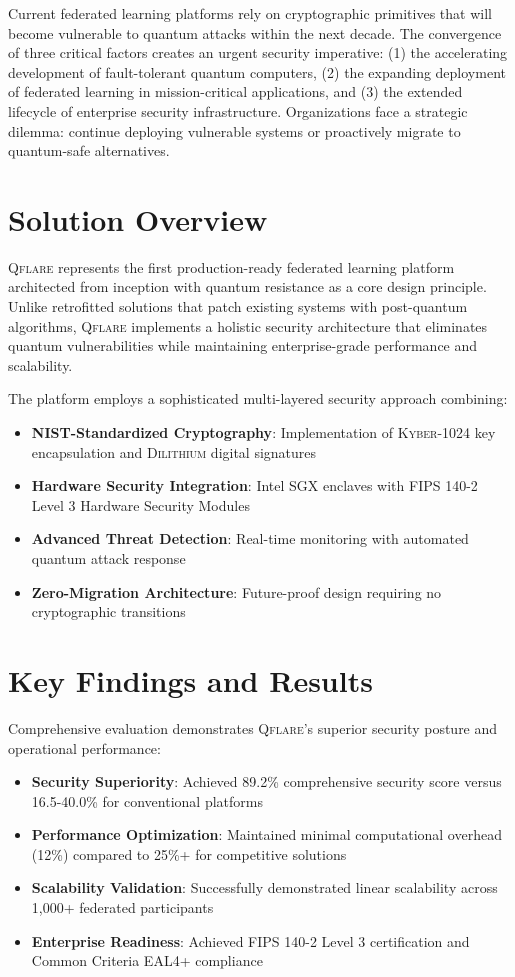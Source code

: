 \documentclass[12pt,a4paper,twoside]{book}
\newcommand{\qflare}{\textsc{Qflare}}
\newcommand{\kyber}{\textsc{Kyber}}
\newcommand{\dilithium}{\textsc{Dilithium}}
\begin{document}
Current federated learning platforms rely on cryptographic primitives that will become vulnerable to quantum attacks within the next decade. The convergence of three critical factors creates an urgent security imperative: (1) the accelerating development of fault-tolerant quantum computers, (2) the expanding deployment of federated learning in mission-critical applications, and (3) the extended lifecycle of enterprise security infrastructure. Organizations face a strategic dilemma: continue deploying vulnerable systems or proactively migrate to quantum-safe alternatives.

\section*{Solution Overview}

\qflare{} represents the first production-ready federated learning platform architected from inception with quantum resistance as a core design principle. Unlike retrofitted solutions that patch existing systems with post-quantum algorithms, \qflare{} implements a holistic security architecture that eliminates quantum vulnerabilities while maintaining enterprise-grade performance and scalability.

The platform employs a sophisticated multi-layered security approach combining:
\begin{itemize}
\item \textbf{NIST-Standardized Cryptography}: Implementation of \kyber{}-1024 key encapsulation and \dilithium{} digital signatures
\item \textbf{Hardware Security Integration}: Intel SGX enclaves with FIPS 140-2 Level 3 Hardware Security Modules
\item \textbf{Advanced Threat Detection}: Real-time monitoring with automated quantum attack response
\item \textbf{Zero-Migration Architecture}: Future-proof design requiring no cryptographic transitions
\end{itemize}

\section*{Key Findings and Results}

Comprehensive evaluation demonstrates \qflare{}'s superior security posture and operational performance:

\begin{itemize}
\item \textbf{Security Superiority}: Achieved 89.2\% comprehensive security score versus 16.5-40.0\% for conventional platforms
\item \textbf{Performance Optimization}: Maintained minimal computational overhead (12\%) compared to 25\%+ for competitive solutions
\item \textbf{Scalability Validation}: Successfully demonstrated linear scalability across 1,000+ federated participants
\item \textbf{Enterprise Readiness}: Achieved FIPS 140-2 Level 3 certification and Common Criteria EAL4+ compliance
\end{itemize}
\end{document}
